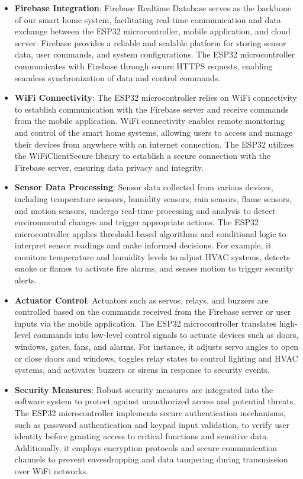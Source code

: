 \begin{itemize}
    \item \textbf{Firebase Integration}: Firebase Realtime Database serves as the backbone of our smart home system, facilitating real-time communication and data exchange between the ESP32 microcontroller, mobile application, and cloud server. Firebase provides a reliable and scalable platform for storing sensor data, user commands, and system configurations. The ESP32 microcontroller communicates with Firebase through secure HTTPS requests, enabling seamless synchronization of data and control commands.

    \item \textbf{WiFi Connectivity}: The ESP32 microcontroller relies on WiFi connectivity to establish communication with the Firebase server and receive commands from the mobile application. WiFi connectivity enables remote monitoring and control of the smart home systems, allowing users to access and manage their devices from anywhere with an internet connection. The ESP32 utilizes the WiFiClientSecure library to establish a secure connection with the Firebase server, ensuring data privacy and integrity.

    \item \textbf{Sensor Data Processing}: Sensor data collected from various devices, including temperature sensors, humidity sensors, rain sensors, flame sensors, and motion sensors, undergo real-time processing and analysis to detect environmental changes and trigger appropriate actions. The ESP32 microcontroller applies threshold-based algorithms and conditional logic to interpret sensor readings and make informed decisions. For example, it monitors temperature and humidity levels to adjust HVAC systems, detects smoke or flames to activate fire alarms, and senses motion to trigger security alerts.

    \item \textbf{Actuator Control}: Actuators such as servos, relays, and buzzers are controlled based on the commands received from the Firebase server or user inputs via the mobile application. The ESP32 microcontroller translates high-level commands into low-level control signals to actuate devices such as doors, windows, gates, fans, and alarms. For instance, it adjusts servo angles to open or close doors and windows, toggles relay states to control lighting and HVAC systems, and activates buzzers or sirens in response to security events.

    \item \textbf{Security Measures}: Robust security measures are integrated into the software system to protect against unauthorized access and potential threats. The ESP32 microcontroller implements secure authentication mechanisms, such as password authentication and keypad input validation, to verify user identity before granting access to critical functions and sensitive data. Additionally, it employs encryption protocols and secure communication channels to prevent eavesdropping and data tampering during transmission over WiFi networks.
\end{itemize}

